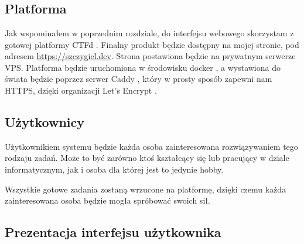 \documentclass[polish,12pt]{aghthesis}
\begin{document}
\section{\SectionTitleScope}
\label{sec:zakres-funkcjonalnosci}

\subsection{Platforma}

Jak wspominałem w poprzednim rozdziale, do interfejsu webowego skorzystam
z gotowej platformy CTFd \cite{CTFd}. Finalny produkt będzie
dostępny na mojej stronie, pod adresem \href{https://szczygiel.dev}{https://szczygiel.dev}.
Strona postawiona będzie na prywatnym serwerze VPS. Platforma będzie
uruchomiona w środowisku docker \cite{docker},
a wystawiona do świata będzie poprzez serwer Caddy \cite{Caddy},
który w prosty sposób zapewni nam HTTPS, dzięki organizacji Let's Encrypt \cite{lets_encrypt}.

\subsection{Użytkownicy}

Użytkownikiem systemu będzie każda osoba zainteresowana rozwiązywaniem
tego rodzaju zadań. Może to być zarówno ktoś kształcący się lub pracujący
w dziale informatycznym, jak i osoba dla której jest to jedynie hobby.

Wszystkie gotowe zadania zostaną wrzucone na platformę, dzięki czemu
każda zainteresowana osoba będzie mogła spróbować swoich sił.

\clearpage

\subsection{Prezentacja interfejsu użytkownika}
\end{document}
